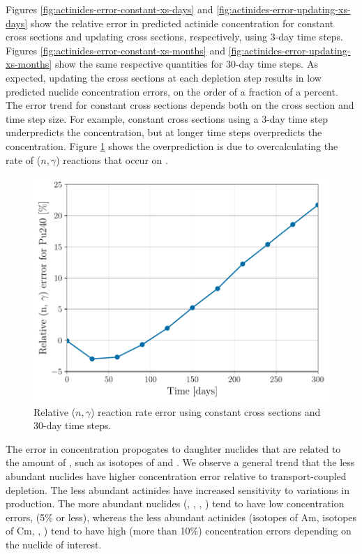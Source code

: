     Figures \ref{fig:actinides-error-constant-xs-days} and
    \ref{fig:actinides-error-updating-xs-days} show the relative error in
    predicted actinide concentration for constant cross sections and updating
    cross sections, respectively, using 3-day time steps. Figures
    \ref{fig:actinides-error-constant-xs-months} and
    \ref{fig:actinides-error-updating-xs-months} show the same respective
    quantities for 30-day time steps. As expected, updating the cross sections
    at each depletion step results in low predicted nuclide concentration
    errors, on the order of a fraction of a percent. The error trend for
    constant cross sections depends both on the cross section and time step
    size. For example, constant cross sections using a 3-day time step
    underpredicts the  concentration, but at longer time steps
    overpredicts the concentration. Figure \ref{fig:pu240-n-gamma-months} shows
    the overprediction is due to overcalculating the rate of ($n,\gamma$) reactions
    that occur on . 
    \begin{figure}[htpb]
        \centering
        \includegraphics[width=0.5\linewidth]{figs/pu240-n-gamma-months.pdf}
        \caption{Relative  ($n,\gamma$) reaction rate error using
        constant cross sections and 30-day time steps.}
        \label{fig:pu240-n-gamma-months}
    \end{figure}

    The error in  concentration propogates to daughter nuclides
    that are related to the amount of , such as isotopes of 
    and . We observe a general trend that the less abundant
    nuclides have higher concentration error relative to transport-coupled
    depletion. The less abundant actinides have increased sensitivity to
    variations in production. The more abundant nuclides (,
    , , ) tend to have low concentration
    errors, (5\% or less), whereas the less abundant actinides (isotopes of Am,
    isotopes of Cm, , ) tend to have high (more
    than 10\%) concentration errors depending on the nuclide of interest.


